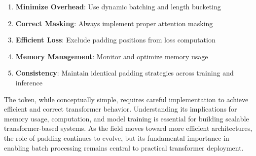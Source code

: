 \begin{principle}
\begin{enumerate}
\item \textbf{Minimize Overhead}: Use dynamic batching and length bucketing
\item \textbf{Correct Masking}: Always implement proper attention masking
\item \textbf{Efficient Loss}: Exclude padding positions from loss computation
\item \textbf{Memory Management}: Monitor and optimize memory usage
\item \textbf{Consistency}: Maintain identical padding strategies across training and inference
\end{enumerate}
\end{principle}

The \pad{} token, while conceptually simple, requires careful implementation to achieve efficient and correct transformer behavior. Understanding its implications for memory usage, computation, and model training is essential for building scalable transformer-based systems. As the field moves toward more efficient architectures, the role of padding continues to evolve, but its fundamental importance in enabling batch processing remains central to practical transformer deployment.